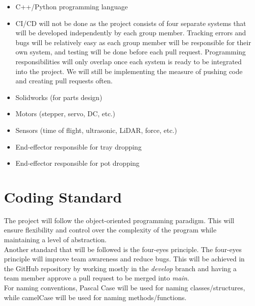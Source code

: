\documentclass{article}
\begin{document}
	\begin{itemize}
	\item C++/Python programming language
	\item CI/CD will not be done as the project consists of four separate systems that will be developed independently by each group member. Tracking errors and bugs will be relatively 
	easy as each group member will be responsible for their own system, and testing will be done before each pull request. Programming responsibilities will only overlap once each 
	system is ready to be integrated into the project. We will still be implementing the measure of pushing code and creating pull requests often.
	\item Solidworks (for parts design)
	\item Motors (stepper, servo, DC, etc.)
	\item Sensors (time of flight, ultrasonic, LiDAR, force, etc.)
	\item End-effector responsible for tray dropping
	\item End-effector responsible for pot dropping
	\end{itemize}
	
	\section{Coding Standard}
	The project will follow the object-oriented programming paradigm. This will ensure flexibility 
	and control over the complexity of the program while maintaining a level of abstraction.\\

	\noindent Another standard that will be followed is the four-eyes principle. The four-eyes principle 
	will improve team awareness and reduce bugs. This will be achieved in the GitHub repository by 
	working mostly in the \emph{develop} branch and having a team member approve a pull request to be merged into \emph{main}.\\

	\noindent For naming conventions, Pascal Case will be used for naming classes/structures, while camelCase will be used for naming methods/functions.
\end{document}
